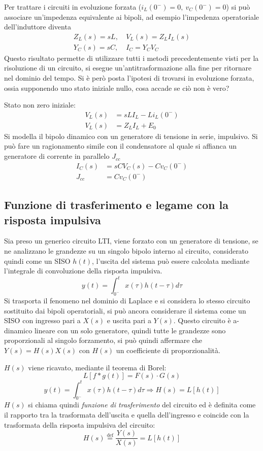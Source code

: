 Per trattare i circuiti in evoluzione forzata ($i_L(0^-)=0,\ v_C(0^-)=0$) si può associare un'impedenza equivalente
ai bipoli, ad esempio l'impedenza operatoriale dell'induttore diventa
$$\begin{aligned}
Z_L(s) = sL,&\ V_L(s) = Z_LI_L(s)\\
Y_C(s) = sC,&\ I_C= Y_C V_C 
\end{aligned}$$
Questo risultato permette di utilizzare tutti i metodi precedentemente visti per la risoluzione
di un circuito, si esegue un'antitrasformazione alla fine per ritornare nel dominio del tempo.
Si è però posta l'ipotesi di trovarsi in evoluzione forzata, ossia supponendo uno stato iniziale 
nullo, cosa accade se ciò non è vero?

Stato non zero iniziale:
$$\begin{aligned}
V_L(s) &= sLI_L - L i_L(0^-)\\
V_L(s) &= Z_LI_L+E_0
\end{aligned}$$
Si modella il bipolo dinamico con un generatore di tensione in serie, impulsivo.
Si può fare un ragionamento simile con il condensatore al quale si affianca un generatore di corrente
in parallelo $J_{cc}$
$$\begin{aligned}
I_C(s) &= sCV_C(s) - Cv_C(0^-)\\
J_{cc} &= Cv_C(0^-)
\end{aligned}$$

\subsection{Funzione di trasferimento e legame con la risposta impulsiva}
Sia preso un generico circuito LTI, viene forzato con un generatore di tensione, se ne analizzano
le grandezze su un singolo bipolo interno al circuito, considerato quindi come un SISO $h(t)$,
l'uscita del sistema può essere calcolata mediante l'integrale di convoluzione della risposta impulsiva.
$$
y(t) = \int_{0^-}^{t} x(\tau)h(t-\tau)d\tau
$$
Si trasporta il fenomeno nel dominio di Laplace e si considera lo stesso circuito sostituito dai bipoli
operatoriali, si può ancora considerare il sistema come un SISO con ingresso pari a $X(s)$ e uscita
pari a $Y(s)$.
Questo circuito è a-dinamico lineare con un solo generatore, quindi tutte le grandezze sono proporzionali
al singolo forzamento, si può quindi affermare che $Y(s) = H(s)X(s)$ con $H(s)$ un coefficiente di 
proporzionalità.

$H(s)$ viene ricavato, mediante il teorema di Borel:
$$
L[f*g(t)] = F(s)\cdot G(s)
$$
$$
y(t) = \int_{0^-}^{t} x(\tau)h(t-\tau) d\tau \Rightarrow H(s) = L[h(t)]
$$
$H(s)$ si chiama quindi \textit{funzione di trasferimento} del circuito ed è definita come il rapporto
tra la trasformata dell'uscita e quella dell'ingresso e coincide con la trasformata della risposta
impulsiva del circuito:
$$
H(s) \stackrel{\text{def}}{=} \frac{Y(s)}{X(s)} = L[h(t)]
$$

